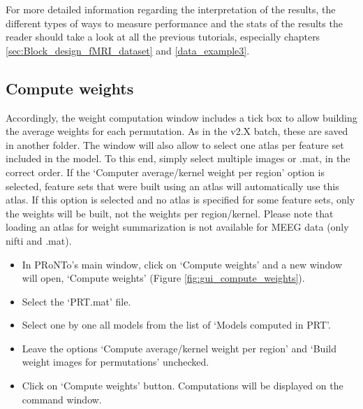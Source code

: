 For more detailed information regarding the interpretation of the results, the different types of ways to measure performance and the stats of the results the reader should take a look at all the previous tutorials, especially chapters \ref{sec:Block_design_fMRI_dataset} and \ref{data_example3}.


\subsection{Compute weights}

Accordingly, the weight computation window includes a tick box to allow building the average weights for each permutation. As in the v2.X batch, these are saved in another folder. The window will also allow to select one atlas per feature set included in the model. To this end, simply select multiple images or .mat, in the correct order. If the ‘Computer average/kernel weight per region’ option is selected, feature sets that were built using an atlas will automatically use this atlas. If this option is selected and no atlas is specified for some feature sets, only the weights will be built, not the weights per region/kernel. Please note that loading an atlas for weight summarization is not available for MEEG data (only nifti and .mat).

\begin{itemize}

\item In PRoNTo's main window, click on `Compute weights' and a new window will open, `Compute weights' (Figure \ref{fig:gui_compute_weights}).

\item Select the `PRT.mat' file.

\item Select one by one all models from the list of `Models computed in PRT'.


\item Leave the options `Compute average/kernel weight per region' and `Build weight images for permutations' unchecked.

\item Click on `Compute weights' button. Computations will be displayed on the \matlab{} command window.

\end{itemize}

